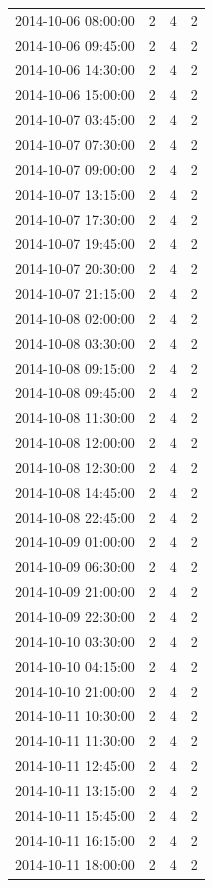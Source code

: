 \begin{tabular}{lrrr}
2014-10-06 08:00:00 & 2 & 4 & 2 \\
2014-10-06 09:45:00 & 2 & 4 & 2 \\
2014-10-06 14:30:00 & 2 & 4 & 2 \\
2014-10-06 15:00:00 & 2 & 4 & 2 \\
2014-10-07 03:45:00 & 2 & 4 & 2 \\
2014-10-07 07:30:00 & 2 & 4 & 2 \\
2014-10-07 09:00:00 & 2 & 4 & 2 \\
2014-10-07 13:15:00 & 2 & 4 & 2 \\
2014-10-07 17:30:00 & 2 & 4 & 2 \\
2014-10-07 19:45:00 & 2 & 4 & 2 \\
2014-10-07 20:30:00 & 2 & 4 & 2 \\
2014-10-07 21:15:00 & 2 & 4 & 2 \\
2014-10-08 02:00:00 & 2 & 4 & 2 \\
2014-10-08 03:30:00 & 2 & 4 & 2 \\
2014-10-08 09:15:00 & 2 & 4 & 2 \\
2014-10-08 09:45:00 & 2 & 4 & 2 \\
2014-10-08 11:30:00 & 2 & 4 & 2 \\
2014-10-08 12:00:00 & 2 & 4 & 2 \\
2014-10-08 12:30:00 & 2 & 4 & 2 \\
2014-10-08 14:45:00 & 2 & 4 & 2 \\
2014-10-08 22:45:00 & 2 & 4 & 2 \\
2014-10-09 01:00:00 & 2 & 4 & 2 \\
2014-10-09 06:30:00 & 2 & 4 & 2 \\
2014-10-09 21:00:00 & 2 & 4 & 2 \\
2014-10-09 22:30:00 & 2 & 4 & 2 \\
2014-10-10 03:30:00 & 2 & 4 & 2 \\
2014-10-10 04:15:00 & 2 & 4 & 2 \\
2014-10-10 21:00:00 & 2 & 4 & 2 \\
2014-10-11 10:30:00 & 2 & 4 & 2 \\
2014-10-11 11:30:00 & 2 & 4 & 2 \\
2014-10-11 12:45:00 & 2 & 4 & 2 \\
2014-10-11 13:15:00 & 2 & 4 & 2 \\
2014-10-11 15:45:00 & 2 & 4 & 2 \\
2014-10-11 16:15:00 & 2 & 4 & 2 \\
2014-10-11 18:00:00 & 2 & 4 & 2 \\

\end{tabular}
